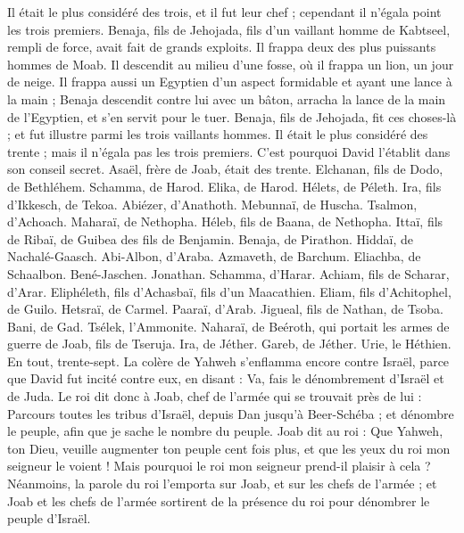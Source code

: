 \begin{multicols}{2}
Il était le plus considéré des trois, et il fut leur chef ; cependant il n’égala point les trois premiers.
Benaja, fils de Jehojada, fils d'un vaillant homme de Kabtseel, rempli de force, avait fait de grands exploits. Il frappa deux des plus puissants hommes de Moab. Il descendit au milieu d’une fosse, où il frappa un lion, un jour de neige.
Il frappa aussi un Egyptien d’un aspect formidable et ayant une lance à la main ; Benaja descendit contre lui avec un bâton, arracha la lance de la main de l'Egyptien, et s’en servit pour le tuer.
Benaja, fils de Jehojada, fit ces choses-là ; et fut illustre parmi les trois vaillants hommes.
Il était le plus considéré des trente ; mais il n'égala pas les trois premiers. C'est pourquoi David l'établit dans son conseil secret.
Asaël, frère de Joab, était des trente. Elchanan, fils de Dodo, de Bethléhem.
Schamma, de Harod. Elika, de Harod.
Hélets, de Péleth. Ira, fils d’Ikkesch, de Tekoa.
Abiézer, d’Anathoth. Mebunnaï, de Huscha.
Tsalmon, d’Achoach. Maharaï, de Nethopha.
Héleb, fils de Baana, de Nethopha. Ittaï, fils de Ribaï, de Guibea des fils de Benjamin.
Benaja, de Pirathon. Hiddaï, de Nachalé-Gaasch.
Abi-Albon, d’Araba. Azmaveth, de Barchum.
Eliachba, de Schaalbon. Bené-Jaschen. Jonathan.
Schamma, d’Harar. Achiam, fils de Scharar, d’Arar.
Eliphéleth, fils d'Achasbaï, fils d’un Maacathien. Eliam, fils d'Achitophel, de Guilo.
Hetsraï, de Carmel. Paaraï, d’Arab.
Jigueal, fils de Nathan, de Tsoba. Bani, de Gad.
Tsélek, l’Ammonite. Naharaï, de Beéroth, qui portait les armes de guerre de Joab, fils de Tseruja.
Ira, de Jéther. Gareb, de Jéther.
Urie, le Héthien. En tout, trente-sept.
\VerseOne{}La colère de Yahweh s'enflamma encore contre Israël, parce que David fut incité contre eux, en disant : Va, fais le dénombrement d'Israël et de Juda.
Le roi dit donc à Joab, chef de l'armée qui se trouvait près de lui : Parcours toutes les tribus d'Israël, depuis Dan jusqu'à Beer-Schéba ; et dénombre le peuple, afin que je sache le nombre du peuple.
Joab dit au roi : Que Yahweh, ton Dieu, veuille augmenter ton peuple cent fois plus, et que les yeux du roi mon seigneur le voient ! Mais pourquoi le roi mon seigneur prend-il plaisir à cela ?
Néanmoins, la parole du roi l’emporta sur Joab, et sur les chefs de l'armée ; et Joab et les chefs de l'armée sortirent de la présence du roi pour dénombrer le peuple d’Israël.

\end{multicols}
